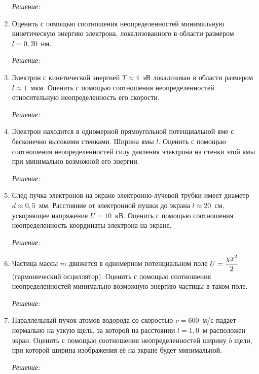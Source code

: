 \begin{enumerate}
\emph{Решение:}

\newpage

\item Оценить с помощью соотношения неопределенностей минимальную кинетическую
энергию электрона, локализованного в области размером \( l = 0,\!20 \)~нм.

\emph{Решение:}

\newpage

\item Электрон с кинетической энергией \( T \approx 4 \)~эВ локализован в
области размером \( l \approx 1 \)~мкм. Оценить с помощью соотношения
неопределенностей относительную неопределенность его скорости.

\emph{Решение:}

\newpage

\item Электрон находится в одномерной прямоугольной потенциальной яме с
бесконечно высокими стенками. Ширина ямы \( l \). Оценить с помощью соотношения
неопределенностей силу давления электрона на стенки этой ямы при минимально
возможной его энергии.

\emph{Решение:}

\newpage

\item След пучка электронов на экране электронно-лучевой трубки имеет диаметр
\( d \approx 0,\!5 \)~мм. Расстояние от электронной пушки до экрана
\( l \approx 20 \)~см, ускоряющее напряжение \( U = 10 \)~кВ. Оценить с помощью
соотношения неопределенность координаты электрона на экране.

\emph{Решение:}

\newpage

\item Частица массы \( m \) движется в одномерном потенциальном поле
\( U = \cfrac{\chi x^2}{2} \) (гармонический осциллятор). Оценить с помощью
соотношения неопределенностей минимально возможную энергию частицы в таком поле.

\emph{Решение:}

\newpage

\item Параллельный пучок атомов водорода со скоростью \( \nu = 600 \)~м/с падает
нормально на узкую щель, за которой 	на расстоянии \( l = 1,\!0 \)~м расположен
экран. Оценить с помощью соотношения неопределенностей ширину \( b \) щели, при
которой ширина изображения её на экране будет минимальной.

\emph{Решение:}

\end{enumerate}
